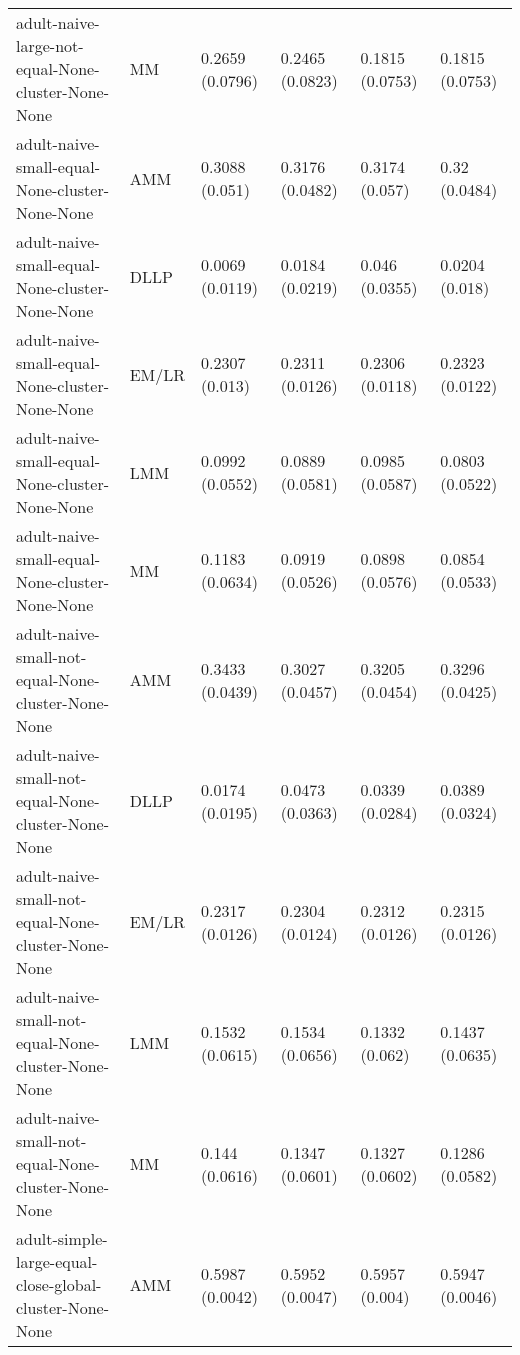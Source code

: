 \begin{longtable}{llllll}
                                     adult-naive-large-not-equal-None-cluster-None-None &        MM & 0.2659 (0.0796) &  0.2465 (0.0823) &   0.1815 (0.0753) &     0.1815 (0.0753) \\
                                         adult-naive-small-equal-None-cluster-None-None &       AMM &  0.3088 (0.051) &  0.3176 (0.0482) &    0.3174 (0.057) &       0.32 (0.0484) \\
                                         adult-naive-small-equal-None-cluster-None-None &      DLLP & 0.0069 (0.0119) &  0.0184 (0.0219) &    0.046 (0.0355) &      0.0204 (0.018) \\
                                         adult-naive-small-equal-None-cluster-None-None &     EM/LR &  0.2307 (0.013) &  0.2311 (0.0126) &   0.2306 (0.0118) &     0.2323 (0.0122) \\
                                         adult-naive-small-equal-None-cluster-None-None &       LMM & 0.0992 (0.0552) &  0.0889 (0.0581) &   0.0985 (0.0587) &     0.0803 (0.0522) \\
                                         adult-naive-small-equal-None-cluster-None-None &        MM & 0.1183 (0.0634) &  0.0919 (0.0526) &   0.0898 (0.0576) &     0.0854 (0.0533) \\
                                     adult-naive-small-not-equal-None-cluster-None-None &       AMM & 0.3433 (0.0439) &  0.3027 (0.0457) &   0.3205 (0.0454) &     0.3296 (0.0425) \\
                                     adult-naive-small-not-equal-None-cluster-None-None &      DLLP & 0.0174 (0.0195) &  0.0473 (0.0363) &   0.0339 (0.0284) &     0.0389 (0.0324) \\
                                     adult-naive-small-not-equal-None-cluster-None-None &     EM/LR & 0.2317 (0.0126) &  0.2304 (0.0124) &   0.2312 (0.0126) &     0.2315 (0.0126) \\
                                     adult-naive-small-not-equal-None-cluster-None-None &       LMM & 0.1532 (0.0615) &  0.1534 (0.0656) &    0.1332 (0.062) &     0.1437 (0.0635) \\
                                     adult-naive-small-not-equal-None-cluster-None-None &        MM &  0.144 (0.0616) &  0.1347 (0.0601) &   0.1327 (0.0602) &     0.1286 (0.0582) \\
                                adult-simple-large-equal-close-global-cluster-None-None &       AMM & 0.5987 (0.0042) &  0.5952 (0.0047) &    0.5957 (0.004) &     0.5947 (0.0046) \\

\end{longtable}
